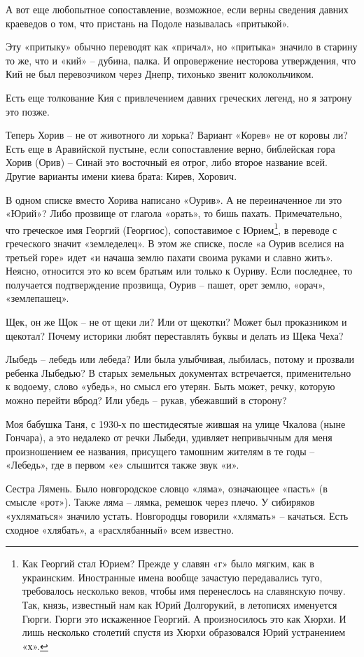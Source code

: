 А вот еще любопытное сопоставление, возможное, если верны сведения давних краеведов о том, что пристань на Подоле называлась «притыкой».

Эту «притыку» обычно переводят как «причал», но «притыка» значило в старину то же, что и «кий» – дубина, палка. И опровержение несторова утверждения, что Кий не был перевозчиком через Днепр, тихонько звенит колокольчиком.

Есть еще толкование Кия с привлечением давних греческих легенд, но я затрону это позже.

Теперь Хорив – не от животного ли хорька? Вариант «Корев» не от коровы ли? Есть еще в Аравийской пустыне, если сопоставление верно, библейская гора Хорив (Орив) – Синай это восточный ея отрог, либо второе название всей. Другие варианты имени киева брата: Кирев, Хорович.

В одном списке вместо Хорива написано «Оурив». А не переиначенное ли это «Юрий»? Либо прозвище от глагола «орать», то бишь пахать. Примечательно, что греческое имя Георгий (Георгиос), сопоставимое с Юрием\footnote{Как Георгий стал Юрием? Прежде у славян «г» было мягким, как в украинским. Иностранные имена вообще зачастую передавались туго, требовалось несколько веков, чтобы имя перенеслось на славянскую почву. Так, князь, известный нам как Юрий Долгорукий, в летописях именуется Гюрги. Гюрги это искаженное Георгий. А произносилось это как Хюрхи. И лишь несколько столетий спустя из Хюрхи образовался Юрий устранением «х».}, в переводе с греческого значит «земледелец». В этом же списке, после «а Оурив вселися на третьей горе» идет «и начаша землю пахати своима руками и славно жить». Неясно, относится это ко всем братьям или только к Оуриву. Если последнее, то получается подтверждение прозвища, Оурив – пашет, орет землю, «орач», «землепашец».

Щек, он же Щок – не от щеки ли? Или от щекотки? Может был проказником и щекотал? Почему историки любят переставлять буквы и делать из Щека Чеха?

Лыбедь – лебедь или лебеда? Или была улыбчивая, лыбилась, потому и прозвали ребенка Лыбедью? В старых земельных документах встречается, применительно к водоему, слово «убедь», но смысл его утерян. Быть может, речку, которую можно перейти вброд? Или убедь – рукав, убежавший в сторону?

Моя бабушка Таня, с 1930-х по шестидесятые жившая на улице Чкалова (ныне Гончара), а это недалеко от речки Лыбеди, удивляет непривычным для меня произношением ее названия, присущего тамошним жителям в те годы – «Лебедь», где в первом «е» слышится также звук «и».

Сестра Лямень. Было новгородское словцо «ляма», означающее «пасть» (в смысле «рот»). Также ляма – лямка, ремешок через плечо. У сибиряков «ухляматься» значило устать. Новгородцы говорили «хлямать» – качаться. Есть сходное «хлябать», а «расхлябанный» всем известно.
